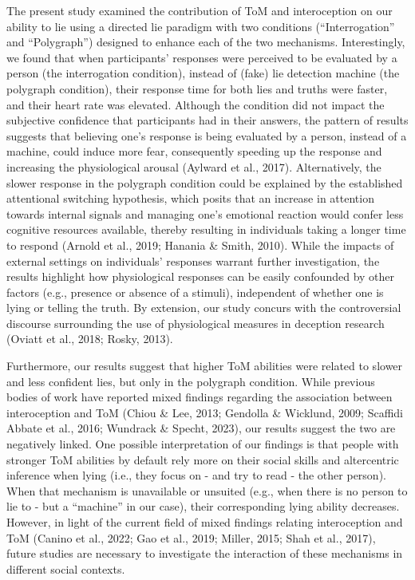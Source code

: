 \documentclass[
  man,mask,floatsintext]{apa6}
\begin{document}
The present study examined the contribution of ToM and interoception on our ability to lie using a directed lie paradigm with two conditions (``Interrogation'' and ``Polygraph'') designed to enhance each of the two mechanisms. Interestingly, we found that when participants' responses were perceived to be evaluated by a person (the interrogation condition), instead of (fake) lie detection machine (the polygraph condition), their response time for both lies and truths were faster, and their heart rate was elevated. Although the condition did not impact the subjective confidence that participants had in their answers, the pattern of results suggests that believing one's response is being evaluated by a person, instead of a machine, could induce more fear, consequently speeding up the response and increasing the physiological arousal (Aylward et al., 2017). Alternatively, the slower response in the polygraph condition could be explained by the established attentional switching hypothesis, which posits that an increase in attention towards internal signals and managing one's emotional reaction would confer less cognitive resources available, thereby resulting in individuals taking a longer time to respond (Arnold et al., 2019; Hanania \& Smith, 2010). While the impacts of external settings on individuals' responses warrant further investigation, the results highlight how physiological responses can be easily confounded by other factors (e.g., presence or absence of a stimuli), independent of whether one is lying or telling the truth. By extension, our study concurs with the controversial discourse surrounding the use of physiological measures in deception research (Oviatt et al., 2018; Rosky, 2013).

Furthermore, our results suggest that higher ToM abilities were related to slower and less confident lies, but only in the polygraph condition. While previous bodies of work have reported mixed findings regarding the association between interoception and ToM (Chiou \& Lee, 2013; Gendolla \& Wicklund, 2009; Scaffidi Abbate et al., 2016; Wundrack \& Specht, 2023), our results suggest the two are negatively linked. One possible interpretation of our findings is that people with stronger ToM abilities by default rely more on their social skills and altercentric inference when lying (i.e., they focus on - and try to read - the other person). When that mechanism is unavailable or unsuited (e.g., when there is no person to lie to - but a ``machine'' in our case), their corresponding lying ability decreases. However, in light of the current field of mixed findings relating interoception and ToM (Canino et al., 2022; Gao et al., 2019; Miller, 2015; Shah et al., 2017), future studies are necessary to investigate the interaction of these mechanisms in different social contexts.
\end{document}
